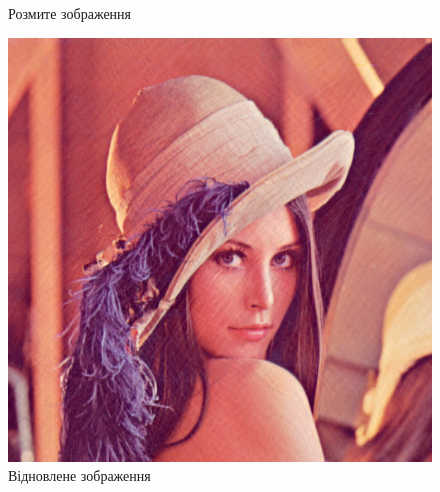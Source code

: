 \documentclass{diploma}
\begin{document}
\begin{figure}[htb]
          \caption{Розмите зображення}\label{fig:Lenna-blurred-img}
        \endminipage\hfill
          \includegraphics[width=\linewidth]{Lenna-b0deconv.png}
          \caption{Відновлене зображення}\label{fig:Lenna-b0deconv}
        \endminipage\hfill


\end{figure}
\end{document}
